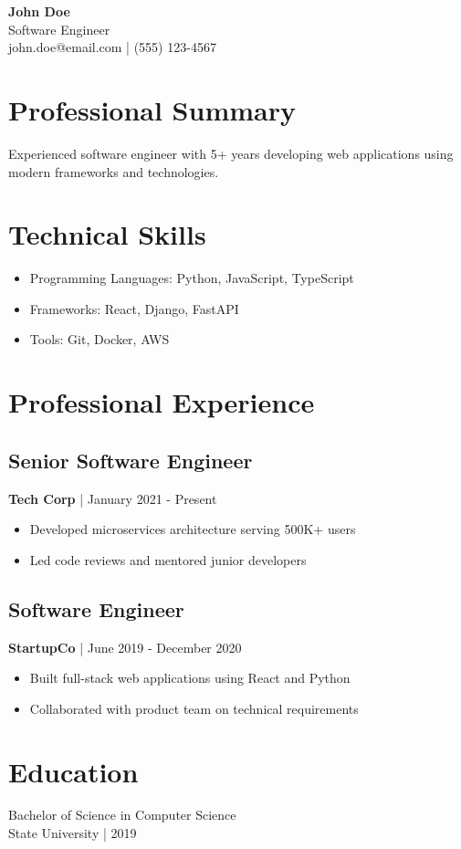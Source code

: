 \documentclass[11pt]{article}
\begin{document}
\begin{center}
{\Large \textbf{John Doe}}\\
Software Engineer\\
john.doe@email.com | (555) 123-4567
\end{center}

\section{Professional Summary}
Experienced software engineer with 5+ years developing web applications using modern frameworks and technologies.

\section{Technical Skills}
\begin{itemize}[noitemsep]
    \item Programming Languages: Python, JavaScript, TypeScript
    \item Frameworks: React, Django, FastAPI
    \item Tools: Git, Docker, AWS
\end{itemize}

\section{Professional Experience}
\subsection{Senior Software Engineer}
\textbf{Tech Corp} | January 2021 - Present
\begin{itemize}[noitemsep]
    \item Developed microservices architecture serving 500K+ users
    \item Led code reviews and mentored junior developers
\end{itemize}

\subsection{Software Engineer}
\textbf{StartupCo} | June 2019 - December 2020
\begin{itemize}[noitemsep]
    \item Built full-stack web applications using React and Python
    \item Collaborated with product team on technical requirements
\end{itemize}

\section{Education}
Bachelor of Science in Computer Science\\
State University | 2019
\end{document}
